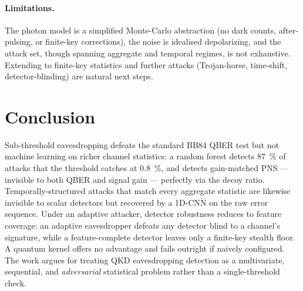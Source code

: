 \documentclass[11pt]{article}
\begin{document}
\paragraph{Limitations.} The photon model is a simplified Monte-Carlo abstraction (no
dark counts, after-pulsing, or finite-key corrections), the noise is idealised
depolarizing, and the attack set, though spanning aggregate and temporal regimes,
is not exhaustive. Extending to finite-key statistics and further attacks
(Trojan-horse, time-shift, detector-blinding) are natural next steps.

\section{Conclusion}
Sub-threshold eavesdropping defeats the standard BB84 QBER test but not machine
learning on richer channel statistics: a random forest detects \SI{87}{\percent} of
attacks that the threshold catches at \SI{0.8}{\percent}, and detects gain-matched PNS
--- invisible to both QBER and signal gain --- perfectly via the decoy ratio.
Temporally-structured attacks that match every aggregate statistic are likewise
invisible to scalar detectors but recovered by a 1D-CNN on the raw error sequence.
Under an adaptive attacker, detector robustness reduces to feature coverage: an
adaptive eavesdropper defeats any detector blind to a channel's signature, while a
feature-complete detector leaves only a finite-key stealth floor. A quantum kernel
offers no advantage and fails outright if naively configured. The work argues for
treating QKD eavesdropping detection as a multivariate, sequential, and
\emph{adversarial} statistical problem rather than a single-threshold check.
\end{document}
